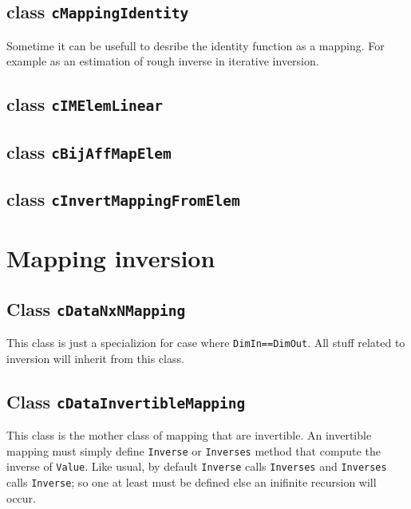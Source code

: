 \subsection{class {\tt cMappingIdentity}}

Sometime it can be usefull to desribe the identity function as a mapping.
For example as an estimation of rough inverse in iterative inversion.


\subsection{class {\tt cIMElemLinear}}
\subsection{class {\tt cBijAffMapElem}}
\subsection{class {\tt cInvertMappingFromElem}}


\section{Mapping inversion}

\subsection{Class {\tt cDataNxNMapping}}

This class is just a specializion for case where {\tt DimIn==DimOut}. All stuff
related to inversion will inherit from this class.


\subsection{Class {\tt cDataInvertibleMapping}}

This class is the mother class of mapping that are invertible. An invertible
mapping must simply define {\tt Inverse}  or {\tt Inverses} method that compute
the inverse of {\tt Value}.  Like usual, by default {\tt Inverse} calls  {\tt Inverses}
and {\tt Inverses} calls  {\tt Inverse}; so one at least must be defined else an
inifinite recursion will occur.


